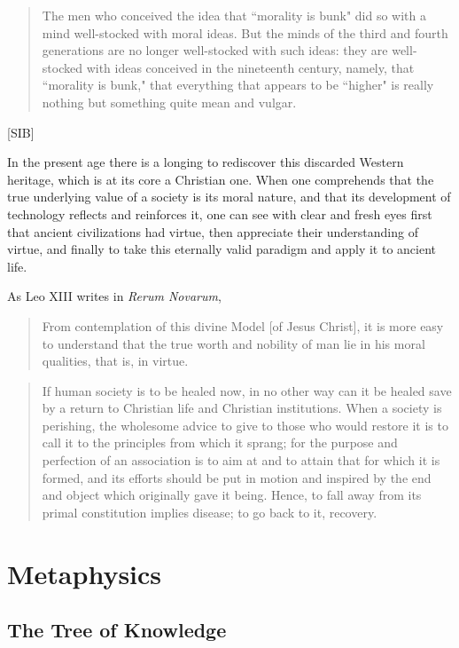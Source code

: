 \documentclass[letterpaper]{article}
\begin{document}
\begin{quote}
  The men who conceived the idea that ``morality is bunk" did so with a mind well-stocked with moral ideas. But the minds of the third and fourth generations are no longer well-stocked with such ideas: they are well-stocked with ideas conceived in the nineteenth century, namely, that ``morality is bunk," that everything that appears to be ``higher" is really nothing but something quite mean and vulgar.
\end{quote}[SIB]

In the present age there is a longing to rediscover this discarded Western heritage, which is at its core a Christian one. When one comprehends that the true underlying value of a society is its moral nature, and that its development of technology reflects and reinforces it, one can see with clear and fresh eyes first that ancient civilizations had virtue, then appreciate their understanding of virtue, and finally to take this eternally valid paradigm and apply it to ancient life.

As Leo XIII writes in \textit{Rerum Novarum},

\begin{quote}
  From contemplation of this divine Model [of Jesus Christ], it is more easy to understand that the true worth and nobility of man lie in his moral qualities, that is, in virtue.
\end{quote}

\begin{quote}
  If human society is to be healed now, in no other way can it be healed save by a return to Christian life and Christian institutions. When a society is perishing, the wholesome advice to give to those who would restore it is to call it to the principles from which it sprang; for the purpose and perfection of an association is to aim at and to attain that for which it is formed, and its efforts should be put in motion and inspired by the end and object which originally gave it being. Hence, to fall away from its primal constitution implies disease; to go back to it, recovery.
\end{quote}

\section{Metaphysics}

\subsection{The Tree of Knowledge}
\end{document}
